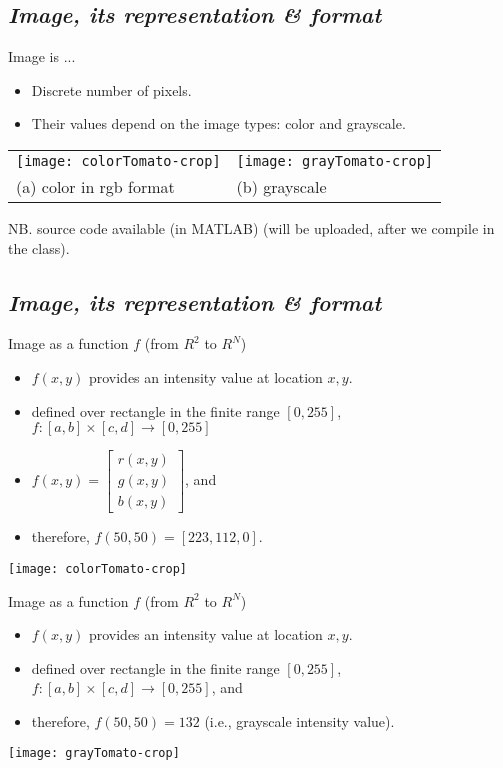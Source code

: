 \documentclass{response}
\begin{document}
\newpage

\subsection*{\Huge\em Image, its representation \& format }
\bigskip


{\large 

Image is ...
\begin{itemize}\setlength\itemsep{-0.5em}
\item Discrete number of pixels.
\item Their values depend on the image types: color and grayscale.
\end{itemize}


\vspace*{0.5cm}

\begin{tabular}{ll}
\texttt{[image: colorTomato-crop]} &  \texttt{[image: grayTomato-crop]}\\
(a) color in rgb format & (b) grayscale  
\end{tabular}

\vfill
NB. source code available (in MATLAB) (will be uploaded, after we compile in the class).
}




\newpage

\subsection*{\Huge\em Image, its representation \& format }
\bigskip


{\large 

Image as a function $f$ (from $R^2$ to $R^N$)
\begin{itemize}\setlength\itemsep{-0.5em}
\item $f(x,y)$ provides an intensity value at location $x,y$.
\item defined over rectangle in the finite range $[0, 255]$, $f: [a,b]\times [c,d]\rightarrow [0, 255]$
\item $f(x,y) = \left[ \begin{smallmatrix} r(x,y)\\ g(x,y)\\b(x,y) \end{smallmatrix} \right]$, and 
\item therefore, $f(50,50) = [223, 112, 0]$.
\end{itemize}
\texttt{[image: colorTomato-crop]}


\newpage
Image as a function $f$ (from $R^2$ to $R^N$)
\begin{itemize}\setlength\itemsep{-0.5em}
\item $f(x,y)$ provides an intensity value at location $x,y$.
\item defined over rectangle in the finite range $[0, 255]$, $f: [a,b]\times [c,d]\rightarrow [0, 255]$, and 
\item therefore, $f(50,50) = 132$ (i.e., grayscale intensity value).
\end{itemize}
\texttt{[image: grayTomato-crop]}

}
\end{document}
